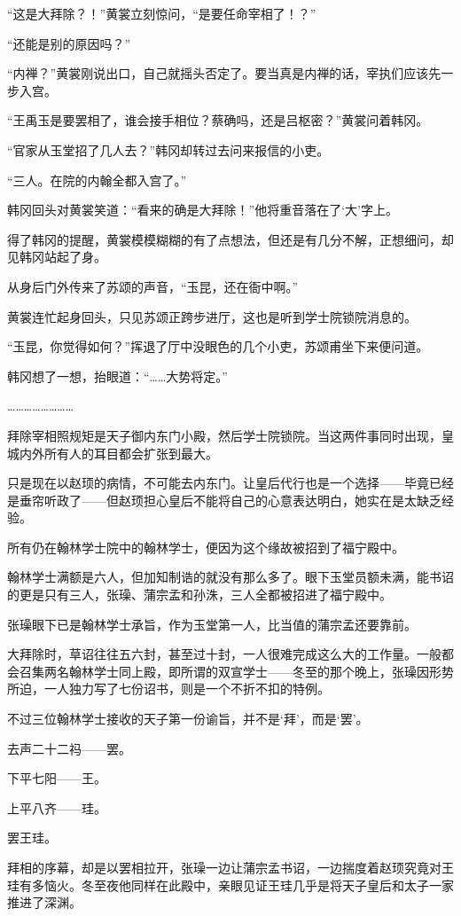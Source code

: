 “这是大拜除？！”黄裳立刻惊问，“是要任命宰相了！？”

“还能是别的原因吗？”

“内禅？”黄裳刚说出口，自己就摇头否定了。要当真是内禅的话，宰执们应该先一步入宫。

“王禹玉是要罢相了，谁会接手相位？蔡确吗，还是吕枢密？”黄裳问着韩冈。

“官家从玉堂招了几人去？”韩冈却转过去问来报信的小吏。

“三人。在院的内翰全都入宫了。”

韩冈回头对黄裳笑道：“看来的确是大拜除！”他将重音落在了‘大’字上。

得了韩冈的提醒，黄裳模模糊糊的有了点想法，但还是有几分不解，正想细问，却见韩冈站起了身。

从身后门外传来了苏颂的声音，“玉昆，还在衙中啊。”

黄裳连忙起身回头，只见苏颂正跨步进厅，这也是听到学士院锁院消息的。

“玉昆，你觉得如何？”挥退了厅中没眼色的几个小吏，苏颂甫坐下来便问道。

韩冈想了一想，抬眼道：“……大势将定。”

……………………

拜除宰相照规矩是天子御内东门小殿，然后学士院锁院。当这两件事同时出现，皇城内外所有人的耳目都会扩张到最大。

只是现在以赵顼的病情，不可能去内东门。让皇后代行也是一个选择——毕竟已经是垂帘听政了——但赵顼担心皇后不能将自己的心意表达明白，她实在是太缺乏经验。

所有仍在翰林学士院中的翰林学士，便因为这个缘故被招到了福宁殿中。

翰林学士满额是六人，但加知制诰的就没有那么多了。眼下玉堂员额未满，能书诏的更是只有三人，张璪、蒲宗孟和孙洙，三人全都被招进了福宁殿中。

张璪眼下已是翰林学士承旨，作为玉堂第一人，比当值的蒲宗孟还要靠前。

大拜除时，草诏往往五六封，甚至过十封，一人很难完成这么大的工作量。一般都会召集两名翰林学士同上殿，即所谓的双宣学士——冬至的那个晚上，张璪因形势所迫，一人独力写了七份诏书，则是一个不折不扣的特例。

不过三位翰林学士接收的天子第一份谕旨，并不是‘拜’，而是‘罢’。

去声二十二祃——罢。

下平七阳——王。

上平八齐——珪。

罢王珪。

拜相的序幕，却是以罢相拉开，张璪一边让蒲宗孟书诏，一边揣度着赵顼究竟对王珪有多恼火。冬至夜他同样在此殿中，亲眼见证王珪几乎是将天子皇后和太子一家推进了深渊。

